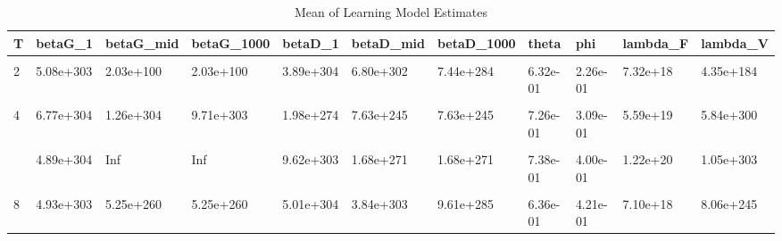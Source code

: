 \begin{table}[!h]
\centering
\caption{Mean of Learning Model Estimates}
\centering
\begin{tabular}[t]{lllllllllll}
\toprule
T & betaG\_1 & betaG\_mid & betaG\_1000 & betaD\_1 & betaD\_mid & betaD\_1000 & theta & phi & lambda\_F & lambda\_V\\
\midrule
\cellcolor{gray!10}{1} & \cellcolor{gray!10}{1.48e+304} & \cellcolor{gray!10}{4.92e+234} & \cellcolor{gray!10}{4.92e+234} & \cellcolor{gray!10}{4.87e+304} & \cellcolor{gray!10}{9.46e+303} & \cellcolor{gray!10}{5.49e+303} & \cellcolor{gray!10}{6.82e-01} & \cellcolor{gray!10}{5.33e-01} & \cellcolor{gray!10}{1.13e+16} & \cellcolor{gray!10}{4.46e+301}\\
2 & 5.08e+303 & 2.03e+100 & 2.03e+100 & 3.89e+304 & 6.80e+302 & 7.44e+284 & 6.32e-01 & 2.26e-01 & 7.32e+18 & 4.35e+184\\
\cellcolor{gray!10}{3} & \cellcolor{gray!10}{3.57e+304} & \cellcolor{gray!10}{9.49e+298} & \cellcolor{gray!10}{9.13e+297} & \cellcolor{gray!10}{2.75e+304} & \cellcolor{gray!10}{Inf} & \cellcolor{gray!10}{Inf} & \cellcolor{gray!10}{6.08e-01} & \cellcolor{gray!10}{5.03e-01} & \cellcolor{gray!10}{6.81e+20} & \cellcolor{gray!10}{7.95e+303}\\
4 & 6.77e+304 & 1.26e+304 & 9.71e+303 & 1.98e+274 & 7.63e+245 & 7.63e+245 & 7.26e-01 & 3.09e-01 & 5.59e+19 & 5.84e+300\\
\cellcolor{gray!10}{5} & \cellcolor{gray!10}{1.93e+304} & \cellcolor{gray!10}{4.39e+303} & \cellcolor{gray!10}{4.38e+303} & \cellcolor{gray!10}{1.44e+304} & \cellcolor{gray!10}{3.60e+164} & \cellcolor{gray!10}{3.60e+164} & \cellcolor{gray!10}{7.48e-01} & \cellcolor{gray!10}{3.30e-01} & \cellcolor{gray!10}{5.96e+19} & \cellcolor{gray!10}{6.62e+297}\\
\addlinespace
6 & 4.89e+304 & Inf & Inf & 9.62e+303 & 1.68e+271 & 1.68e+271 & 7.38e-01 & 4.00e-01 & 1.22e+20 & 1.05e+303\\
\cellcolor{gray!10}{7} & \cellcolor{gray!10}{5.09e+303} & \cellcolor{gray!10}{7.47e+301} & \cellcolor{gray!10}{7.48e+240} & \cellcolor{gray!10}{4.33e+304} & \cellcolor{gray!10}{Inf} & \cellcolor{gray!10}{Inf} & \cellcolor{gray!10}{6.10e-01} & \cellcolor{gray!10}{3.88e-01} & \cellcolor{gray!10}{2.19e+01} & \cellcolor{gray!10}{1.15e+298}\\
8 & 4.93e+303 & 5.25e+260 & 5.25e+260 & 5.01e+304 & 3.84e+303 & 9.61e+285 & 6.36e-01 & 4.21e-01 & 7.10e+18 & 8.06e+245\\
\bottomrule
\end{tabular}
\end{table}